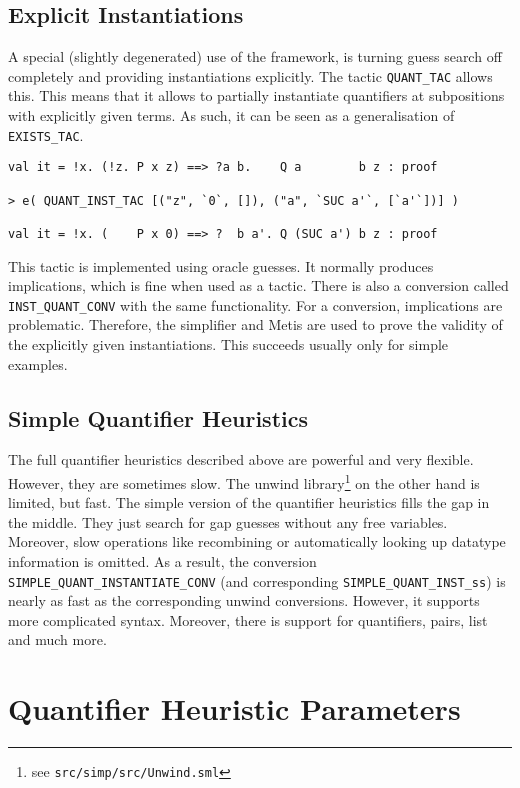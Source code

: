 \documentclass[a4paper,12pt,DIV=12,oneside]{scrbook}
\theoremstyle{definition}
\theoremstyle{remark}
\begin{document}
\subsection{Explicit Instantiations}

A special (slightly degenerated) use of the framework, is turning guess search off completely and
providing instantiations explicitly. The tactic \texttt{QUANT\_TAC} allows this. This means that
it allows to partially instantiate quantifiers at subpositions
with explicitly given terms. As such, it can be seen as
a generalisation of \texttt{EXISTS\_TAC}.
%
{\scriptsize
\begin{verbatim}
val it = !x. (!z. P x z) ==> ?a b.    Q a        b z : proof

> e( QUANT_INST_TAC [("z", `0`, []), ("a", `SUC a'`, [`a'`])] )

val it = !x. (    P x 0) ==> ?  b a'. Q (SUC a') b z : proof
\end{verbatim}}
%
This tactic is implemented using oracle guesses. It normally
produces implications, which is fine when used as a tactic. There is
also a conversion called \texttt{INST\_QUANT\_CONV} with the same
functionality. For a conversion, implications are
problematic. Therefore, the simplifier and Metis are used to prove
the validity of the explicitly given instantiations. This succeeds
usually only for simple examples.


\subsection{Simple Quantifier Heuristics}\label{subsec_simple}

The full quantifier heuristics described above are powerful and very flexible.
However, they are sometimes slow.
The unwind library\footnote{see \texttt{src/simp/src/Unwind.sml}} on the other hand is limited, but fast.
The simple version of the quantifier heuristics fills the gap in the middle.
They just search for gap guesses without any free variables.
Moreover, slow operations like recombining or automatically looking up datatype information is omitted.
As a result, the conversion \texttt{SIMPLE\_QUANT\_INSTANTIATE\_CONV} (and corresponding \texttt{SIMPLE\_QUANT\_INST\_ss}) is nearly as fast as the corresponding unwind conversions.
However, it supports more complicated syntax. Moreover, there is support for quantifiers, pairs, list and much more. 

\section{Quantifier Heuristic Parameters}\label{sec_qps}
\end{document}
